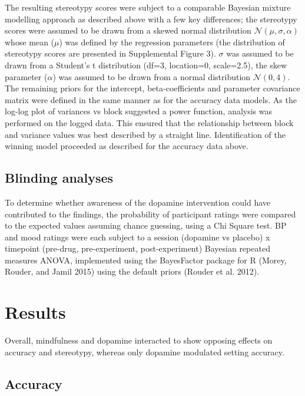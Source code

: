 \documentclass{article}
\begin{document}
The resulting stereotypy scores were subject to a comparable Bayesian
mixture modelling approach as described above with a few key
differences; the stereotypy scores were assumed to be drawn from a
skewed normal distribution \(\mathcal{N}(\mu, \sigma, \alpha)\) whose
mean (\(\mu\)) was defined by the regression parameters (the
distribution of stereotypy scores are presented in Supplemental Figure
3). \(\sigma\) was assumed to be drawn from a Student's t distribution
(df=3, location=0, scale=2.5), the skew parameter (\(\alpha\)) was
assumed to be drawn from a normal distribution \(\mathcal{N}(0,4)\). The
remaining priors for the intercept, beta-coefficients and parameter
covariance matrix were defined in the same manner as for the accuracy
data models. As the log-log plot of variances vs block suggested a power
function, analysis was performed on the logged data. This ensured that
the relationship between block and variance values was best described by
a straight line. Identification of the winning model proceeded as
described for the accuracy data above.

\hypertarget{blinding-analyses}{%
\subsection{Blinding analyses}\label{blinding-analyses}}

To determine whether awareness of the dopamine intervention could have
contributed to the findings, the probability of participant ratings were
compared to the expected values assuming chance guessing, using a Chi
Square test. BP and mood ratings were each subject to a session
(dopamine vs placebo) x timepoint (pre-drug, pre-experiment,
post-experiment) Bayesian repeated measures ANOVA, implemented using the
BayesFactor package for R (Morey, Rouder, and Jamil 2015) using the
default priors (Rouder et al. 2012).

\hypertarget{results}{%
\section{Results}\label{results}}

Overall, mindfulness and dopamine interacted to show opposing effects on
accuracy and stereotypy, whereas only dopamine modulated setting
accuracy.

\hypertarget{accuracy-1}{%
\subsection{Accuracy}\label{accuracy-1}}
\end{document}
